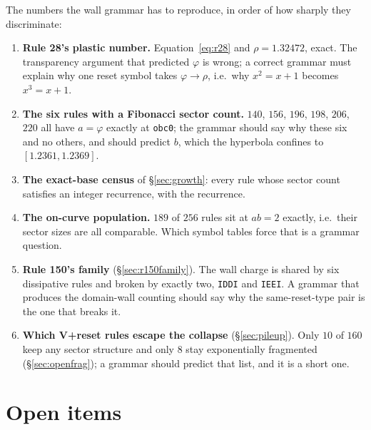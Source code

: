 \documentclass[11pt]{article}
\newcommand{\rt}[1]{\texttt{#1}}
\theoremstyle{plain}
\theoremstyle{definition}
\begin{document}
The numbers the wall grammar has to reproduce, in order of how sharply they
discriminate:

\begin{enumerate}
\item \textbf{Rule 28's plastic number.} Equation~\eqref{eq:r28} and
  $\rho=1.32472$, exact. The transparency argument that predicted $\varphi$ is
  wrong; a correct grammar must explain why one reset symbol takes
  $\varphi\to\rho$, i.e.\ why $x^2=x+1$ becomes $x^3=x+1$.
\item \textbf{The six rules with a Fibonacci sector count.} $140$, $156$, $196$,
  $198$, $206$, $220$ all have $a=\varphi$ exactly at \rt{obc0}; the grammar should say why these six and
  no others, and should predict $b$, which the hyperbola confines to
  $[1.2361,1.2369]$.
\item \textbf{The exact-base census} of \S\ref{sec:growth}: every rule whose
  sector count satisfies an integer recurrence, with the recurrence.
\item \textbf{The on-curve population.} $189$ of $256$ rules sit at $ab=2$
  exactly, i.e.\ their sector sizes are all comparable. Which symbol tables force
  that is a grammar question.
\item \textbf{Rule 150's family} (\S\ref{sec:r150family}). The wall charge is
  shared by six dissipative rules and broken by exactly two, \rt{IDDI} and
  \rt{IEEI}. A grammar that produces the domain-wall counting should say why the
  same-reset-type pair is the one that breaks it.
\item \textbf{Which V+reset rules escape the collapse} (\S\ref{sec:pileup}).
  Only $10$ of $160$ keep any sector structure and only $8$ stay
  exponentially fragmented (\S\ref{sec:openfrag}); a grammar should predict that
  list, and it is a short one.
\end{enumerate}

\section{Open items}
\end{document}
